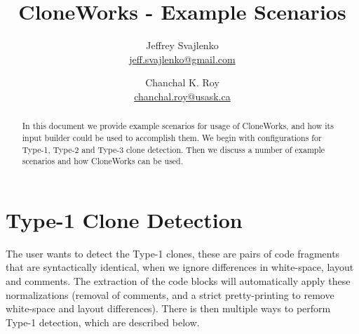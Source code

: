 \documentclass[]{article}
\begin{document}
	\title{CloneWorks - Example Scenarios}
	\author{Jeffrey Svajlenko \\ \href{mailto:jeff.svajlenko@gmail.com}{jeff.svajlenko@gmail.com} \and Chanchal K. Roy \\ \href{mailto:chanchal.roy@usask.ca}{chanchal.roy@usask.ca}}
	\maketitle
	
	\begin{abstract}
	In this document we provide example scenarios for usage of CloneWorks, and how its input builder could be used to accomplish them.  We begin with configurations for Type-1, Type-2 and Type-3 clone detection.  Then we discuss a number of example scenarios and how CloneWorks can be used.
	\end{abstract}

	
	\newpage
	
	\tableofcontents
	\newpage

	\section{Type-1 Clone Detection}
	The user wants to detect the Type-1 clones, these are pairs of code fragments that are syntactically identical, when we ignore differences in white-space, layout and comments.  The extraction of the code blocks will automatically apply these normalizations (removal of comments, and a strict pretty-printing to remove white-space and layout differences).  There is then multiple ways to perform Type-1 detection, which are described below.
	
\end{document}
